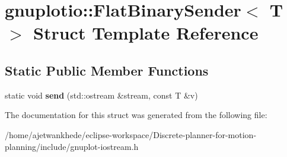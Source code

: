 \hypertarget{structgnuplotio_1_1FlatBinarySender}{}\section{gnuplotio\+:\+:Flat\+Binary\+Sender$<$ T $>$ Struct Template Reference}
\label{structgnuplotio_1_1FlatBinarySender}
\subsection*{Static Public Member Functions}
\begin{DoxyCompactItemize}
\item 
\mbox{\label{structgnuplotio_1_1FlatBinarySender_a24d085492f2539c14033cd5c6ba75ba5}} 
static void {\bfseries send} (std\+::ostream \&stream, const T \&v)
\end{DoxyCompactItemize}


The documentation for this struct was generated from the following file\+:\begin{DoxyCompactItemize}
\item 
/home/ajetwankhede/eclipse-\/workspace/\+Discrete-\/planner-\/for-\/motion-\/planning/include/gnuplot-\/iostream.\+h\end{DoxyCompactItemize}
